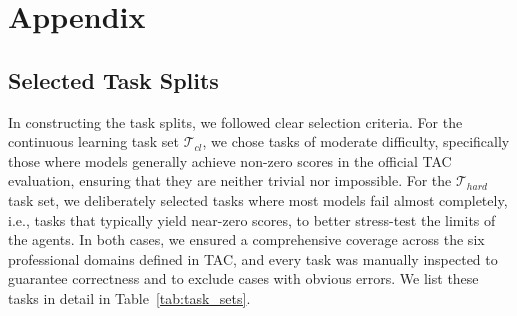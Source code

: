 \newpage
\appendix
\section{Appendix}


\subsection{Selected Task Splits}
\label{app:task_split}
In constructing the task splits, we followed clear selection criteria. 
For the continuous learning task set $\mathcal{T}_{cl}$, we chose tasks of moderate difficulty, specifically those where models generally achieve non-zero scores in the official TAC evaluation, ensuring that they are neither trivial nor impossible. 
For the $\mathcal{T}_{hard}$ task set, we deliberately selected tasks where most models fail almost completely, i.e., tasks that typically yield near-zero scores, to better stress-test the limits of the agents. 
In both cases, we ensured a comprehensive coverage across the six professional domains defined in TAC, and every task was manually inspected to guarantee correctness and to exclude cases with obvious errors. We list these tasks in detail in Table~\ref{tab:task_sets}.



